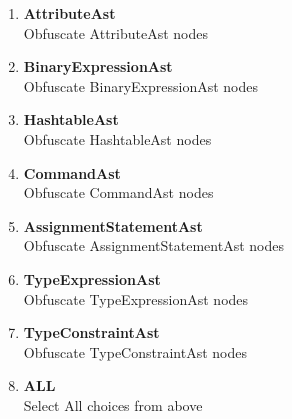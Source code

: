 \documentclass{article}%
\begin{document}
\begin{itemize}
\begin{enumerate}
		\item \textbf{AttributeAst}               
			\\Obfuscate AttributeAst nodes
		\item \textbf{BinaryExpressionAst}        
			\\Obfuscate BinaryExpressionAst nodes
		\item \textbf{HashtableAst}               
			\\Obfuscate HashtableAst nodes
		\item \textbf{CommandAst}                 
			\\Obfuscate CommandAst nodes
		\item \textbf{AssignmentStatementAst}     
			\\Obfuscate AssignmentStatementAst nodes
		\item \textbf{TypeExpressionAst}          
			\\Obfuscate TypeExpressionAst nodes
		\item \textbf{TypeConstraintAst}          
			\\Obfuscate TypeConstraintAst nodes
		\item \textbf{ALL}                        
			\\Select All choices from above


\end{enumerate}
\end{itemize}
\end{document}
